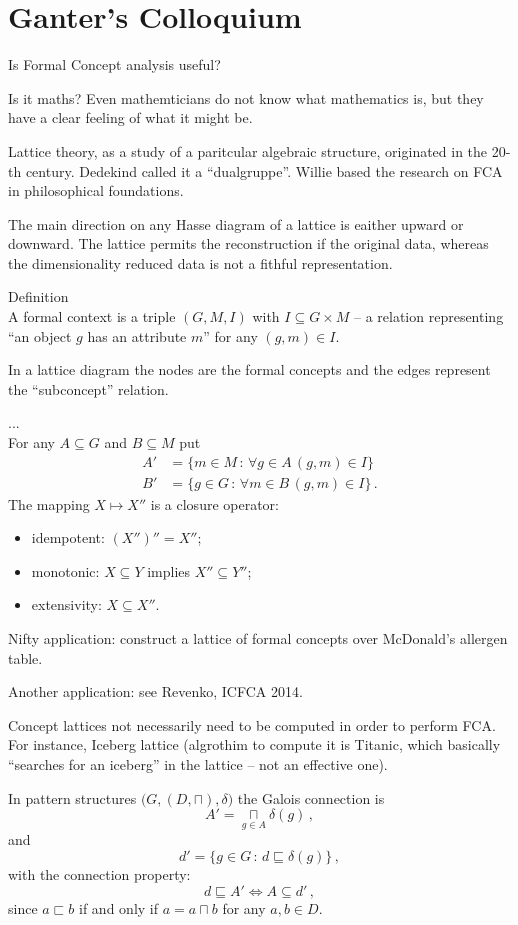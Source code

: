 \section{Ganter's Colloquium} %
\label{sec:ganters_colloquium}

Is Formal Concept analysis useful?

Is it maths? Even mathemticians do not know what mathematics is, but they
have a clear feeling of what it might be.

Lattice theory, as a study of a paritcular algebraic structure, originated in
the 20-th century. Dedekind called it a ``dualgruppe''. Willie based the
research on FCA in philosophical foundations.

The main direction on any Hasse diagram of a lattice is eaither upward or
downward. The lattice permits the reconstruction if the original data, whereas
the dimensionality reduced data is not a fithful representation.


\noindent Definition \hfill \\
A formal context is a triple $(G,M,I)$ with $I\subseteq G\times M$ -- a relation
representing ``an object $g$ has an attribute $m$'' for any $(g,m)\in I$.

In a lattice diagram the nodes are the formal concepts and the edges represent
the ``subconcept'' relation.

\noindent ...\hfill\\

For any $A\subseteq G$ and $B\subseteq M$ put
\begin{align*}
	A' &= \{ m\in M\,:\, \forall g\in A\, (g,m)\in I \}\\
	B' &= \{ g\in G\,:\, \forall m\in B\, (g,m)\in I \}\,.
\end{align*}
The mapping $X\mapsto X''$ is a closure operator:\begin{itemize}
	\item idempotent: $(X'')'' = X''$;
	\item monotonic: $X\subseteq Y$ implies $X''\subseteq Y''$;
	\item extensivity: $X\subseteq X''$.
\end{itemize}

Nifty application: construct a lattice of formal concepts over McDonald's
allergen table.

Another application: see Revenko, ICFCA 2014.

Concept lattices not necessarily need to be computed in order to perform
FCA. For instance, Iceberg lattice (algrothim to compute it is Titanic, which
basically ``searches for an iceberg'' in the lattice -- not an effective one).


In pattern structures $\bigl(G, (D, \sqcap), \delta\bigr)$ the Galois connection
is
\[ A' = \sqcap\limits_{ g\in A } \delta(g) \,, \]
and
\[ d' = \{ g\in G\,:\, d \sqsubseteq \delta(g) \} \,, \]
with the connection property:
\[ d \sqsubseteq A' \Leftrightarrow A \subseteq d' \,,\]
since $a \sqsubset b$ if and only if $a = a\sqcap b$ for any $a,b\in D$.

